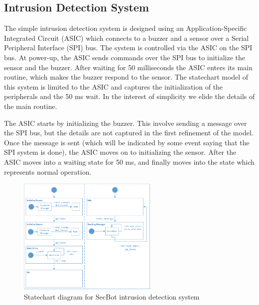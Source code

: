 

\subsection{Intrusion Detection System}
\label{sec:secbot}


The simple intrusion detection system is designed using an Application-Specific Integrated Circuit (ASIC) which connects to a buzzer and a sensor over a Serial Peripheral Interface (SPI) bus. The system is controlled via the ASIC on the SPI bus. At power-up, the ASIC sends commands over the SPI bus to initialize the sensor and the buzzer. After waiting for 50 milliseconds the ASIC enters its main routine, which makes the buzzer respond to the sensor. The statechart model of this system is limited to the ASIC and captures the initialization of the peripherals and the 50 ms wait. In the interest of simplicity we elide the details of the main routine.

The ASIC starts by initializing the buzzer. This involve sending a message over the SPI bus, but the details are not captured in the first refinement of the model. Once the message is sent (which will be indicated by some event saying that the SPI system is done), the ASIC moves on to initializing the sensor. After the ASIC moves into a waiting state for 50 ms, and finally moves into the state which represents normal operation.

\begin{figure}[]
  \begin{centering}
  \includegraphics[width=0.6\textwidth]{figures/Buzzer&Sensor_2}
  \caption{Statechart diagram for SecBot intrusion detection system}
  \label{fig:Buzzer}
  \end{centering}
\end{figure} 




